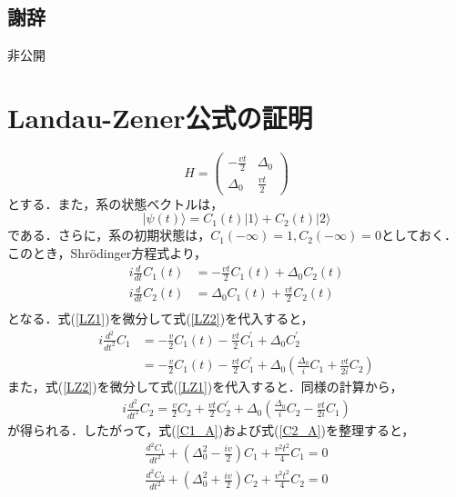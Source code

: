 \documentclass[a4paper, titlepage]{jsreport}
\begin{document}
\section*{謝辞}
非公開

\appendix
\chapter{Landau-Zener公式の証明}

\begin{equation}
  H = 
  \begin{pmatrix}
    -\frac{vt}{2} & \Delta_0\\
    \Delta_0 & \frac{vt}{2}
  \end{pmatrix}
\end{equation}
とする．また，系の状態ベクトルは，
\begin{equation}
  |\psi(t) \rangle = C_1(t) |1\rangle + C_2(t) |2\rangle
\end{equation}
である．さらに，系の初期状態は，$C_1(-\infty) = 1, C_2(-\infty) =0$としておく．このとき，Shr\"{o}dinger方程式より，
\begin{align}
  i\frac{d}{dt} C_1(t) &= -\frac{vt}{2} C_1(t) + \Delta_0 C_2(t) \label{LZ1}\\
  i\frac{d}{dt} C_2(t) &= \Delta_0 C_1(t) + \frac{vt}{2} C_2(t) \label{LZ2}\\
\end{align}
となる．式(\ref{LZ1})を微分して式(\ref{LZ2})を代入すると，
\begin{align}
  i\frac{d^2}{dt^2} C_1
  &= -\frac{v}{2} C_1(t) -\frac{vt}{2} C_1^{\prime} + \Delta_0 C_2^{\prime}\\
  &= -\frac{v}{2} C_1(t) -\frac{vt}{2} C_1^{\prime} + \Delta_0 \left( \frac{\Delta_0}{i} C_1 + \frac{vt}{2i} C_2 \right) \label{C1_A}
\end{align}
また，式(\ref{LZ2})を微分して式(\ref{LZ1})を代入すると．同様の計算から，
\begin{align}
 i\frac{d^2}{dt^2} C_2 = \frac{v}{2} C_2 + \frac{vt}{2} C_2^{\prime} + \Delta_0 \left( \frac{\Delta_0}{i} C_2 - \frac{vt}{2i} C_1 \right) \label{C2_A}
\end{align}
が得られる．したがって，式(\ref{C1_A})および式(\ref{C2_A})を整理すると，
\begin{align}
  \frac{d^2 C_1}{dt^2} + \left( \Delta_0^2 - \frac{iv}{2} \right) C_1 + \frac{v^2 t^2}{4} C_1 = 0\\
  \frac{d^2 C_2}{dt^2} + \left( \Delta_0^2 + \frac{iv}{2} \right) C_2 + \frac{v^2 t^2}{4} C_2 = 0\\
\end{align}
\end{document}
